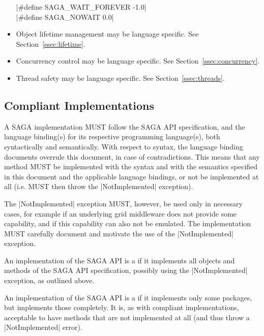 \begin{itemize}
   \shift |#define SAGA_WAIT_FOREVER    -1.0|\\
   \shift |#define SAGA_NOWAIT           0.0|

   \item 
   Object lifetime management may be language specific.
   See Section~\ref{ssec:lifetime}.

   \item 
   Concurrency control may be language specific.  See
   Section~\ref{ssec:concurrency}.

   \item 
   Thread safety may be language specific.  See
   Section~\ref{ssec:threads}.

   \end{itemize}



 \subsection{Compliant Implementations}
  \label{ssec:compliance}

  A SAGA implementation MUST follow the SAGA API specification,
  and the language binding(s) for its respective programming
  language(s), both syntactically and semantically.  
  With respect to syntax, the language binding documents overrule this
  document, in case of contradictions.
  This means that any method MUST be implemented with the syntax and with
  the semantics specified in this document and the applicable language
  bindings, or not be implemented at all (i.e. MUST then throw the
  |NotImplemented| exception).

  The |NotImplemented| exception MUST, however, be used only in
  necessary cases, for example if an underlying grid
  middleware does not provide some capability, and if this
  capability can also not be emulated.  The implementation MUST
  carefully document and motivate the use of the
  |NotImplemented| exception.

  An implementation of the SAGA API is a  if it implements all objects and methods of the
  SAGA API specification, possibly using the |NotImplemented|
  exception, as outlined above.
  
  An implementation of the SAGA API is a  if it implements only some packages, but
  implements those completely. It is, as with compliant
  implementations, acceptable to have methods that are not
  implemented at all (and thus throw a |NotImplemented| error).

